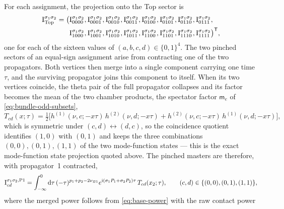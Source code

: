 \documentclass[11pt,a4paper]{article}
\numberwithin{table}{section}
\newcommand{\dd}{\mathrm d}
\newcommand{\ii}{\mathrm i}
\begin{document}
For each assignment, the projection onto the Top sector is
\begin{equation}
 \begin{aligned}
 \bm{\text I}^{\sigma_1\sigma_2}_{\rm Top}
 =\bigl(&\text{I}^{\sigma_1\sigma_2}_{0000},
        \text{I}^{\sigma_1\sigma_2}_{0001},
        \text{I}^{\sigma_1\sigma_2}_{0010},
        \text{I}^{\sigma_1\sigma_2}_{0011},
        \text{I}^{\sigma_1\sigma_2}_{0100},
        \text{I}^{\sigma_1\sigma_2}_{0101},
        \text{I}^{\sigma_1\sigma_2}_{0110},
        \text{I}^{\sigma_1\sigma_2}_{0111},\\
       &\text{I}^{\sigma_1\sigma_2}_{1000},
        \text{I}^{\sigma_1\sigma_2}_{1001},
        \text{I}^{\sigma_1\sigma_2}_{1010},
        \text{I}^{\sigma_1\sigma_2}_{1011},
        \text{I}^{\sigma_1\sigma_2}_{1100},
        \text{I}^{\sigma_1\sigma_2}_{1101},
        \text{I}^{\sigma_1\sigma_2}_{1110},
        \text{I}^{\sigma_1\sigma_2}_{1111}\bigr)^{\mathsf T},
 \end{aligned}
 \label{eq:bubble-top-vector}
\end{equation}
one for each of the sixteen values of $(a,b,c,d)\in\{0,1\}^4$.
The two pinched sectors of an equal-sign assignment arise from contracting one of the two
propagators. Both vertices then merge into a single component carrying one time $\tau$, and the
surviving propagator joins this component to itself. When its two vertices coincide, the theta pair of
the full propagator collapses and its factor becomes the mean of the two chamber products, the
spectator factor $\mathsf m_e$ of \eqref{eq:bundle-odd-subsets},
\begin{equation}
 T_{cd}(x;\tau)
 =\tfrac12\Big[h^{(1)}(\nu,c;-x\tau)\,h^{(2)}(\nu,d;-x\tau)
 +h^{(2)}(\nu,c;-x\tau)\,h^{(1)}(\nu,d;-x\tau)\Big],
 \label{eq:bubble-tadpole-kernel}
\end{equation}
which is symmetric under $(c,d)\leftrightarrow(d,c)$, so the coincidence quotient identifies
$(1,0)$ with $(0,1)$ and keeps the three combinations $(0,0),(0,1),(1,1)$ of the two mode-function
states --- this is the exact mode-function state
projection quoted above. The pinched masters are therefore, with propagator~1 contracted,
\begin{equation}
 \text{I}^{\sigma_1\sigma_2,{\rm P1}}_{cd}
 =\int_{-\infty}^{0}\dd\tau\,
 (-\tau)^{p_1+p_2-2\nu_{B1}}
 e^{\ii(\sigma_1P_1+\sigma_2P_2)\tau}\,
 T_{cd}(x_2;\tau),
 \qquad (c,d)\in\{(0,0),(0,1),(1,1)\},
 \label{eq:bubble-pinch1-masters}
\end{equation}
where the merged power follows from \eqref{eq:base-power} with the raw contact power
\end{document}

